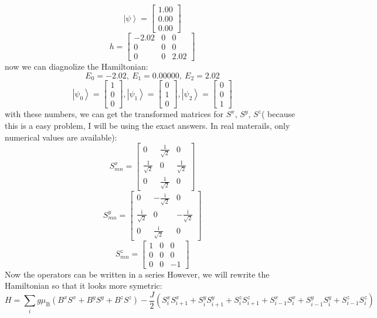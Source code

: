 \documentclass[letterpaper,10pt]{article}
\newcommand{\ii}{\mathrm{i}}
\begin{document}
$$
\left|\psi\right>=\begin{bmatrix}
    1.00 \\
0.00 \\
0.00
    \end{bmatrix}
$$
$$
h=\begin{bmatrix}
    -2.02 & 0 & 0 \\
    0 &  0 & 0 \\
    0 &  0 & 2.02
    \end{bmatrix}
$$
now we can diagnolize the Hamiltonian:
$$E_{0}=-2.02,\ E_{1}=0.00000,\ E_{2}=2.02
$$
$$\left|\psi_0\right>=\begin{bmatrix}
    1 \\
0 \\
0
    \end{bmatrix},\left|\psi_1\right>=\begin{bmatrix}
       0 \\
    1 \\
    0
        \end{bmatrix},\left|\psi_2\right>=\begin{bmatrix}
            0 \\
            0 \\
            1
            \end{bmatrix}
$$
with these numbers, we can get the transformed matrices for $S^x$, $S^y$, $S^z$( because this is a easy problem, I will be using the exact answers. In real materails, only numerical values are available):
$$S^x_{mn}=\begin{bmatrix}
    0& \frac{1}{\sqrt{2}} & 0\\
    \frac{1}{\sqrt{2}} &  0 & \frac{1}{\sqrt{2}}\\
0& \frac{1}{\sqrt{2}}&0
    \end{bmatrix}$$$$
S^y_{mn}=\begin{bmatrix}
    0& -\frac{\ii}{\sqrt{2}} & 0\\
    \frac{\ii}{\sqrt{2}} &  0 & -\frac{\ii}{\sqrt{2}}\\
0& \frac{\ii}{\sqrt{2}}&0
    \end{bmatrix}$$ 
    $$S^z_{mn}=\begin{bmatrix}
1 & 0 & 0 \\
0 &  0 & 0 \\
0 &  0 & -1
\end{bmatrix}$$
Now the operators can be written in a series However, we will rewrite the Hamiltonian so that it looks more symetric: \\
$$H=\sum_{i}g\mu_{\mathrm{B}}(B^x S^x +B^y S^y+B^z S^z)-\frac{J}{2}(S_{i}^x S_{i+1}^x+S_{i}^y S_{i+1}^y+S_{i}^z S_{i+1}^z+S_{i-1}^x S_{i}^x+S_{i-1}^y S_{i}^y+S_{i-1}^z S_{i}^z)$$
\end{document}
